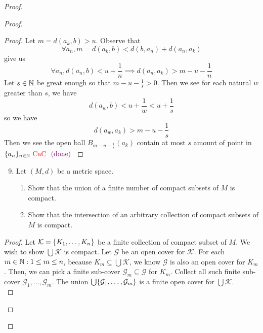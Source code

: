 \documentclass{report}
\begin{document}
\begin{proof}
\begin{proof}
\begin{proof}
Let $m=d(a_k,b)>u$. Observe that 
\begin{equation}
\forall a_n,m=d(a_k,b)<d(b,a_n)+d(a_n,a_k)
\end{equation}
give us
\begin{equation}
\forall a_n, d(a_n,b)<u+\frac{1}{n}\implies d(a_n,a_k)>m-u-\frac{1}{n}
\end{equation}
Let $s\in\mathbb{N}$ be great enough so that  $m-u-\frac{1}{s}>0$. Then we see for each natural $w$ greater than  $s$, we have
 \begin{equation}
d(a_w,b)<u+\frac{1}{w}<u+\frac{1}{s}
\end{equation}
so we have
\begin{equation}
d(a_w,a_k)>m-u-\frac{1}{s}
\end{equation}
Then we see the open ball $B_{m-u-\frac{1}{s}}(a_k)$ contain at most $s$ amount of point in  $\{ a_n \}_{n\in\mathbb{N}}\text{ \textcolor{red}{CaC} }\textcolor{violet}{\text{ (done) }}$
















\end{proof}
\begin{question}{}{}
\begin{enumerate}
    \setcounter{enumi}{8}
    \item Let \( (M, d) \) be a metric space.
    \begin{enumerate}
        \item Show that the union of a finite number of compact subsets of \( M \) is compact.
        \item Show that the intersection of an arbitrary collection of compact subsets of \( M \) is compact.
    \end{enumerate}
\end{enumerate}
\end{question}
\begin{proof}
  Let $\mathcal{K}=\{ K_1,\dots , K_n \}$ be a finite collection of compact subset of $M$. We wish to show $\bigcup  \mathcal{K}$ is compact. Let $\mathcal{G}$ be an open cover for $\mathcal{K}$. For each $m \in\mathbb{N}:1\leq m\leq n$, because $K_m\subseteq \bigcup \mathcal{K}$, we know $\mathcal{G}$ is also an open cover for $K_m$. Then, we can pick a finite sub-cover  $\mathcal{G}_m\subseteq \mathcal{G}$ for $K_m$. Collect all such finite sub-cover  $\mathcal{G}_1,\dots, \mathcal{G}_m$. The union $\bigcup \{ \mathcal{G}_1,\dots ,\mathcal{G}_m \}$ is a finite open cover for $\bigcup \mathcal{K} $.\\


\end{proof}
\end{proof}
\end{proof}
\end{document}
